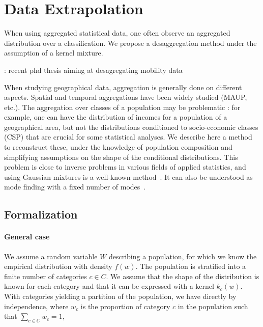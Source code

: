 \section{Data Extrapolation}

When using aggregated statistical data, one often observe an aggregated distribution over a classification. We propose a desaggregation method under the assumption of a kernel mixture.

\cite{pivano2016desagreg} : recent phd thesis aiming at desagregating mobility data


When studying geographical data, aggregation is generally done on different aspects. Spatial and temporal aggregations have been widely studied (MAUP, etc.). The aggregation over classes of a population may be problematic : for example, one can have the distribution of incomes for a population of a geographical area, but not the distributions conditioned to socio-economic classes (CSP) that are crucial for some statistical analyses. We describe here a method to reconstruct these, under the knowledge of population composition and simplifying assumptions on the shape of the conditional distributions. This problem is close to inverse problems in various fields of applied statistics, and using Gaussian mixtures is a well-known method~\cite{yu2012solving}. It can also be understood as mode finding with a fixed number of modes~\cite{carreira2000mode}.


\subsection{Formalization}



\paragraph{General case}

We assume a random variable $W$ describing a population, for which we know the empirical distribution with density $f(w)$. The population is stratified into a finite number of categories $c\in C$. We assume that the shape of the distribution is known for each category and that it can be expressed with a kernel $k_c (w)$. With categories yielding a partition of the population, we have directly by independence, where $w_c$ is the proportion of category $c$ in the population such that $\sum_{c\in C} w_c = 1$,

